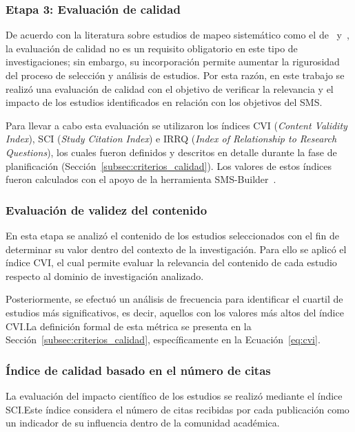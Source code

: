 \subsubsection{Etapa 3: Evaluación de calidad}

De acuerdo con la literatura sobre estudios de mapeo sistemático como el de~\cite{Ali-01} y~\cite{Petersen2008}, la evaluación de calidad 
no es un requisito obligatorio en este tipo de investigaciones; sin embargo, su incorporación permite aumentar la rigurosidad del proceso 
de selección y análisis de estudios. Por esta razón, en este trabajo se realizó una evaluación de calidad con el objetivo de verificar la 
relevancia y el impacto de los estudios identificados en relación con los objetivos del SMS.\@

Para llevar a cabo esta evaluación se utilizaron los índices CVI (\textit{Content Validity Index}), SCI (\textit{Study Citation Index})
e IRRQ (\textit{Index of Relationship to Research Questions}), los cuales fueron definidos y descritos en detalle durante la fase
de planificación (Sección~\ref{subsec:criterios_calidad}). Los valores de estos índices fueron calculados con el apoyo de la herramienta
SMS-Builder~\cite{Candela-Uribe2022}.

\subsubsection{Evaluación de validez del contenido}

En esta etapa se analizó el contenido de los estudios seleccionados con el fin de determinar su valor dentro del contexto de la 
investigación. Para ello se aplicó el índice CVI, el cual permite evaluar la relevancia del contenido de cada estudio respecto al 
dominio de investigación analizado.

Posteriormente, se efectuó un análisis de frecuencia para identificar el cuartil de estudios más significativos, es decir, aquellos 
con los valores más altos del índice CVI.\@ La definición formal de esta métrica se presenta en la 
Sección~\ref{subsec:criterios_calidad}, específicamente en la Ecuación~\ref{eq:cvi}.

\subsubsection{Índice de calidad basado en el número de citas}

La evaluación del impacto científico de los estudios se realizó mediante el índice SCI.\@ Este índice considera el número de citas
recibidas por cada publicación como un indicador de su influencia dentro de la comunidad académica.

